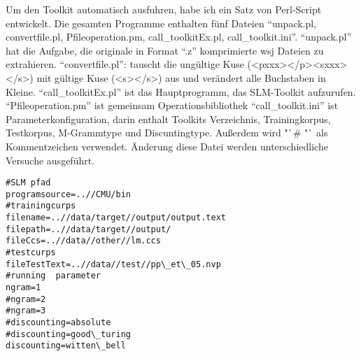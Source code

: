 
Um den Toolkit automatisch ausfuhren, habe ich ein Satz von Perl-Script entwickelt. 
Die gesamten Programme enthalten f\"unf Dateien "`unpack.pl, convertfile.pl, Pfileoperation.pm, call\_toolkitEx.pl, call\_toolkit.ini"'.
"`unpack.pl"' hat die Aufgabe, die originale in Format "`.z"' komprimierte  wsj Dateien zu extrahieren.
"`convertfile.pl"': tauscht die ung\"ultige Kuse (<pxxx></p><sxxx></s>) mit g\"ultige Kuse (<s></s>) aus und ver\"andert alle Buchstaben in Kleine. 
"`call\_toolkitEx.pl"' ist das Hauptprogramm, das SLM-Toolkit aufzurufen. 
"`Pfileoperation.pm"' ist gemeinsam Operationsbibliothek
"`call\_toolkit.ini"' ist Parameterkonfiguration, darin enthalt Toolkits Verzeichnis, Trainingkorpus, Testkorpus, M-Grammtype und Discuntingtype. Au\ss erdem wird  "`\# "`  als Kommentzeichen verwendet. \"Anderung diese Datei werden unterschiedliche Versuche ausgef\"uhrt.\\

\begin{lstlisting}
#SLM pfad 
programsource=..//CMU/bin 
#trainingcurps 
filename=..//data/target//output/output.text 
filepath=..//data/target//output/ 
fileCcs=..//data//other//lm.ccs 
#testcurps 
fileTestText=..//data//test//pp\_et\_05.nvp 
#running  parameter 
ngram=1 
#ngram=2 
#ngram=3 
#discounting=absolute 
#discounting=good\_turing 
discounting=witten\_bell 

\end{lstlisting}
